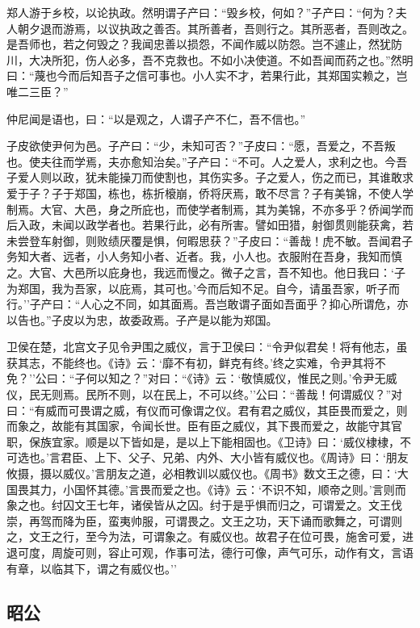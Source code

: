 \documentclass[]{article}
\begin{document}
郑人游于乡校，以论执政。然明谓子产曰：``毁乡校，何如？''子产曰：``何为？夫人朝夕退而游焉，以议执政之善否。其所善者，吾则行之。其所恶者，吾则改之。是吾师也，若之何毁之？我闻忠善以损怨，不闻作威以防怨。岂不遽止，然犹防川，大决所犯，伤人必多，吾不克救也。不如小决使道。不如吾闻而药之也。''然明曰：``蔑也今而后知吾子之信可事也。小人实不才，若果行此，其郑国实赖之，岂唯二三臣？''

仲尼闻是语也，曰：``以是观之，人谓子产不仁，吾不信也。''

子皮欲使尹何为邑。子产曰：``少，未知可否？''子皮曰：``愿，吾爱之，不吾叛也。使夫往而学焉，夫亦愈知治矣。''子产曰：``不可。人之爱人，求利之也。今吾子爱人则以政，犹未能操刀而使割也，其伤实多。子之爱人，伤之而已，其谁敢求爱于子？子于郑国，栋也，栋折榱崩，侨将厌焉，敢不尽言？子有美锦，不使人学制焉。大官、大邑，身之所庇也，而使学者制焉，其为美锦，不亦多乎？侨闻学而后入政，未闻以政学者也。若果行此，必有所害。譬如田猎，射御贯则能获禽，若未尝登车射御，则败绩厌覆是惧，何暇思获？''子皮曰：``善哉！虎不敏。吾闻君子务知大者、远者，小人务知小者、近者。我，小人也。衣服附在吾身，我知而慎之。大官、大邑所以庇身也，我远而慢之。微子之言，吾不知也。他日我曰：`子为郑国，我为吾家，以庇焉，其可也。'今而后知不足。自今，请虽吾家，听子而行。''子产曰：``人心之不同，如其面焉。吾岂敢谓子面如吾面乎？抑心所谓危，亦以告也。''子皮以为忠，故委政焉。子产是以能为郑国。

卫侯在楚，北宫文子见令尹围之威仪，言于卫侯曰：``令尹似君矣！将有他志，虽获其志，不能终也。《诗》云：`靡不有初，鲜克有终。'终之实难，令尹其将不免？''公曰：``子何以知之？''对曰：``《诗》云：`敬慎威仪，惟民之则。'令尹无威仪，民无则焉。民所不则，以在民上，不可以终。''公曰：``善哉！何谓威仪？''对曰：``有威而可畏谓之威，有仪而可像谓之仪。君有君之威仪，其臣畏而爱之，则而象之，故能有其国家，令闻长世。臣有臣之威仪，其下畏而爱之，故能守其官职，保族宜家。顺是以下皆如是，是以上下能相固也。《卫诗》曰：`威仪棣棣，不可选也。'言君臣、上下、父子、兄弟、内外、大小皆有威仪也。《周诗》曰：`朋友攸摄，摄以威仪。'言朋友之道，必相教训以威仪也。《周书》数文王之德，曰：`大国畏其力，小国怀其德。'言畏而爱之也。《诗》云：`不识不知，顺帝之则。'言则而象之也。纣囚文王七年，诸侯皆从之囚。纣于是乎惧而归之，可谓爱之。文王伐崇，再驾而降为臣，蛮夷帅服，可谓畏之。文王之功，天下诵而歌舞之，可谓则之，文王之行，至今为法，可谓象之。有威仪也。故君子在位可畏，施舍可爱，进退可度，周旋可则，容止可观，作事可法，德行可像，声气可乐，动作有文，言语有章，以临其下，谓之有威仪也。''

\hypertarget{header-n2352}{%
\subsection{昭公}\label{header-n2352}}
\end{document}
